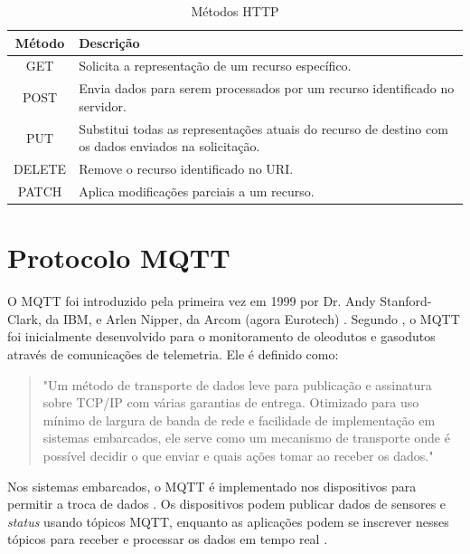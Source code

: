 \begin{table}[!htb]
  \caption{Métodos HTTP} \label{tab:metodos_http}
  \begin{tabularx}{\textwidth}{|c|X|} \hline
    \textbf{Método} & \textbf{Descrição} \\ \hline
    GET & Solicita a representação de um recurso específico. \\ \hline
    POST & Envia dados para serem processados por um recurso identificado no servidor. \\ \hline
    PUT & Substitui todas as representações atuais do recurso de destino com os dados enviados na solicitação. \\ \hline
    DELETE & Remove o recurso identificado no URI. \\ \hline
    PATCH & Aplica modificações parciais a um recurso. \\ \hline  
  \end{tabularx}
\end{table}

\section{Protocolo MQTT}

O MQTT foi introduzido pela primeira vez em 1999 por Dr. Andy Stanford-Clark, da IBM, e Arlen Nipper, da Arcom (agora Eurotech) \parencite{Yassein_mqtt2017}. Segundo \textcite{Andy_mqtt2004}, o MQTT foi inicialmente desenvolvido para o monitoramento de oleodutos e gasodutos através de comunicações de telemetria. Ele é definido como:

\begin{quote}
"Um método de transporte de dados leve para publicação e assinatura sobre TCP/IP com várias garantias de entrega. Otimizado para uso mínimo de largura de banda de rede e facilidade de implementação em sistemas embarcados, ele serve como um mecanismo de transporte onde é possível decidir o que enviar e quais ações tomar ao receber os dados." \parencite[{p. 4}]{Andy_mqtt2004}
\end{quote}

Nos sistemas embarcados, o MQTT é implementado nos dispositivos para permitir a troca de dados \parencite{Andy_mqtt2004}. Os dispositivos podem publicar dados de sensores e \textit{status} usando tópicos MQTT, enquanto as aplicações podem se inscrever nesses tópicos para receber e processar os dados em tempo real \parencite{Yassein_mqtt2017}.

